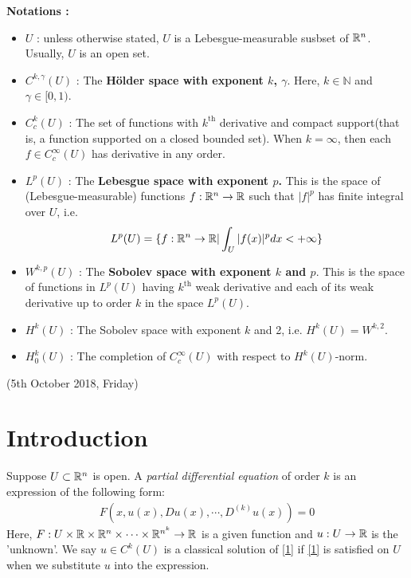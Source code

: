 \documentclass[12pt,a4paper]{report}
\begin{document}
\textbf{Notations :}
\begin{itemize}
\item $U$ : unless otherwise stated, $U$ is a Lebesgue-measurable susbset of $\mathbb{R}^n$. Usually, $U$ is an open set.
\item $C^{k, \gamma}(U)$ : The \textbf{H\"{o}lder space with exponent $k$, $\gamma$}. Here, $k\in \mathbb{N}$ and $\gamma \in [0,1)$.
\item $C^{k}_{c}(U)$ : The set of functions with $k^{\text{th}}$ derivative and compact support(that is, a function supported on a closed bounded set). When $k= \infty$, then each $f\in C^{\infty}_c(U)$ has derivative in any order.
\item $L^p(U)$ : The \textbf{Lebesgue space with exponent $p$.} This is the space of (Lebesgue-measurable) functions $f: \mathbb{R}^n \rightarrow \mathbb{R}$ such that $|f|^p$ has finite integral over $U$, i.e.
\begin{align*}
L^p(U) = \{f : \mathbb{R}^n \rightarrow \mathbb{R} | \int_U |f(x)|^p dx < + \infty \}
\end{align*}
\item $W^{k,p}(U)$ : The \textbf{Sobolev space with exponent $k$ and $p$}. This is the space of functions in $L^p(U)$ having $k^{\text{th}}$ weak derivative and each of its weak derivative up to order $k$ in the space $L^p(U)$.
\item $H^{k}(U)$ : The Sobolev space with exponent $k$ and 2, i.e. $H^k(U) = W^{k,2}$.
\item $H^k_0(U)$ : The completion of $C_c^{\infty}(U)$ with respect to $H^{k}(U)$-norm.
\end{itemize}
\newday

(5th October 2018, Friday)

\section*{Introduction}

Suppose $U \subset \mathbb{R}^n$ is open. A \emph{partial differential equation} of order $k$ is an expression of the following form:
\begin{align}
F(x, u(x),Du(x),\cdots,D^{(k)}u(x))=0 \label{1}
\end{align}
Here, $F: U \times \mathbb{R}\times \mathbb{R}^n \times \cdots \times \mathbb{R}^{n^k} \rightarrow \mathbb{R}$ is a given function and $u : U \rightarrow \mathbb{R}$ is the 'unknown'. We say $u\in C^k(U)$ is a classical solution of \ref{1} if \ref{1} is satisfied on $U$ when we substitute $u$ into the expression.
\s
\end{document}
